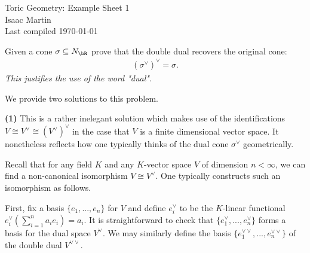 


\pagestyle{empty}
	\LARGE
\begin{center}
	Toric Geometry: Example Sheet 1 \\
	\Large
	Isaac Martin \\
    Last compiled \today
\end{center}
\normalsize
\vspace{-2mm}
\hru
{}
\begin{homework}[e]
	\prob Given a cone $\sigma \subseteq N_\bR$ prove that the double dual recovers the original cone:
	\begin{align*}
		(\sigma^{\vee})^{\vee} = \sigma.
	\end{align*}
	\emph{This justifies the use of the word "dual"}.
	\begin{prf}
		We provide two solutions to this problem.

		\textbf{(1)} This is a rather inelegant solution which makes use of the identifications $V\cong V^\vee \cong (V^{\vee})^{\vee}$ in the case that $V$ is a finite dimensional vector space. It nonetheless reflects how one typically thinks of the dual cone $\sigma^{\vee}$ geometrically.

		Recall that for any field $K$ and any $K$-vector space $V$ of dimension $n < \infty$, we can find a non-canonical isomorphism  $V \cong V^\vee$. One typically constructs such an isomorphism as follows.

		First, fix a basis $\{e_1, ...,e_n\}$ for $V$ and define $e^{\vee}_i$ to be the $K$-linear functional $e^{\vee}_i\left(\sum_{i=1}^n a_i e_i\right) = a_i$. It is straightforward to check that $\{e^{\vee}_1,...,e_n^{\vee}\}$ forms a basis for the dual space $V^{\vee}.$ We may similarly define the basis $\{e_1^{\vee \vee},...,e_n^{\vee \vee}\}$ of the double dual $V^{\vee\vee}$.


\end{prf}
\end{homework}
